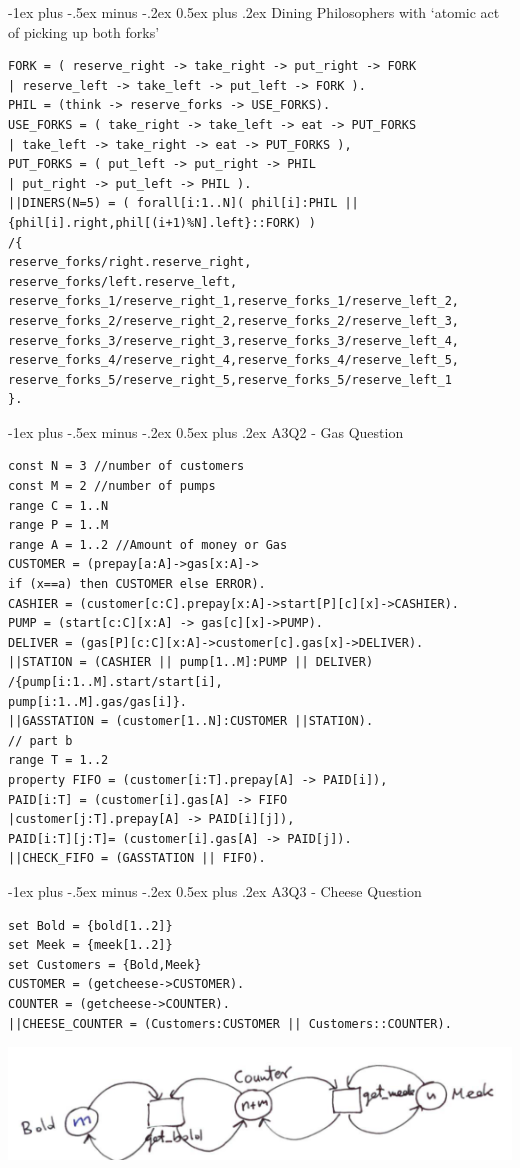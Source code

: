 \documentclass[letterpaper, 8pt]{extarticle}
\makeatletter
\renewcommand{\section}{\@startsection{section}{1}{0mm}%
                                {-1ex plus -.5ex minus -.2ex}%
                                {0.5ex plus .2ex}%
                                {\normalfont\normalsize\bfseries}}
\makeatother
\begin{document}
\begin{multicols*}{5}
  \section{Dining Philosophers with ‘atomic act of picking up both forks’}
  \begin{lstlisting}
FORK = ( reserve_right -> take_right -> put_right -> FORK
| reserve_left -> take_left -> put_left -> FORK ).
PHIL = (think -> reserve_forks -> USE_FORKS).
USE_FORKS = ( take_right -> take_left -> eat -> PUT_FORKS
| take_left -> take_right -> eat -> PUT_FORKS ),
PUT_FORKS = ( put_left -> put_right -> PHIL
| put_right -> put_left -> PHIL ).
||DINERS(N=5) = ( forall[i:1..N]( phil[i]:PHIL || {phil[i].right,phil[(i+1)%N].left}::FORK) )
/{
reserve_forks/right.reserve_right,
reserve_forks/left.reserve_left,
reserve_forks_1/reserve_right_1,reserve_forks_1/reserve_left_2,
reserve_forks_2/reserve_right_2,reserve_forks_2/reserve_left_3,
reserve_forks_3/reserve_right_3,reserve_forks_3/reserve_left_4,
reserve_forks_4/reserve_right_4,reserve_forks_4/reserve_left_5,
reserve_forks_5/reserve_right_5,reserve_forks_5/reserve_left_1
}.
\end{lstlisting}

  \section{A3Q2 - Gas Question}
  \begin{lstlisting}
const N = 3 //number of customers
const M = 2 //number of pumps
range C = 1..N
range P = 1..M
range A = 1..2 //Amount of money or Gas
CUSTOMER = (prepay[a:A]->gas[x:A]->
if (x==a) then CUSTOMER else ERROR).
CASHIER = (customer[c:C].prepay[x:A]->start[P][c][x]->CASHIER).
PUMP = (start[c:C][x:A] -> gas[c][x]->PUMP).
DELIVER = (gas[P][c:C][x:A]->customer[c].gas[x]->DELIVER).
||STATION = (CASHIER || pump[1..M]:PUMP || DELIVER)
/{pump[i:1..M].start/start[i],
pump[i:1..M].gas/gas[i]}.
||GASSTATION = (customer[1..N]:CUSTOMER ||STATION).
// part b
range T = 1..2
property FIFO = (customer[i:T].prepay[A] -> PAID[i]),
PAID[i:T] = (customer[i].gas[A] -> FIFO
|customer[j:T].prepay[A] -> PAID[i][j]),
PAID[i:T][j:T]= (customer[i].gas[A] -> PAID[j]).
||CHECK_FIFO = (GASSTATION || FIFO).
\end{lstlisting}

  \section{A3Q3 - Cheese Question}
  \begin{lstlisting}
set Bold = {bold[1..2]}
set Meek = {meek[1..2]}
set Customers = {Bold,Meek}
CUSTOMER = (getcheese->CUSTOMER).
COUNTER = (getcheese->COUNTER).
||CHEESE_COUNTER = (Customers:CUSTOMER || Customers::COUNTER).
\end{lstlisting}
  \includegraphics[width = \linewidth]{COMPSCI-2SD3/a3q3.png}


\end{multicols*}
\end{document}

